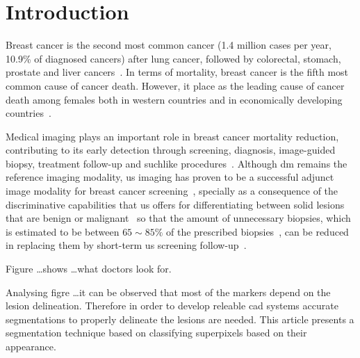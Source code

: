 \graphicspath{ {./content/intro/figures/} }

\section{Introduction}
\label{sec:intro}  %


Breast cancer is the second most common cancer (1.4 million cases per year, 10.9\% of  diagnosed cancers) after lung cancer, followed by colorectal, stomach, prostate and liver cancers~\cite{Ferlay2010}.
In terms of mortality, breast cancer is the fifth most common cause of cancer death.
However, it place as the leading cause of cancer death among females both in western countries and in economically developing countries~\cite{cancerStatistics2011}.

Medical imaging plays an important role in breast cancer mortality reduction, contributing to its early detection through screening, diagnosis, image-guided biopsy, treatment follow-up and suchlike procedures~\cite{smith2003american}.
Although \ac{dm} remains the reference imaging modality, \ac{us} imaging has proven to be a successful adjunct image modality for breast cancer screening~\cite{smith2003american,berg2004diagnostic}, specially as a consequence of the discriminative capabilities that \ac{us} offers for differentiating between solid lesions that are benign or malignant~\cite{Stavros:1995p12392} so that the amount of unnecessary biopsies, which is estimated to be between $65\sim85\%$ of the prescribed biopsies~\cite{yuan2010multimodality}, can be reduced~\cite{ciatto1994contribution} in replacing them by short-term \ac{us} screening follow-up~\cite{gordon1995malignant}.

Figure \dots shows \dots what doctors look for.

Analysing figre \dots it can be observed that most of the markers depend on the lesion delineation.
Therefore in order to develop releable \ac{cad} systems accurate segmentations to properly delineate the lesions are needed. 
This article presents a segmentation technique based on classifying superpixels based on their appearance.


